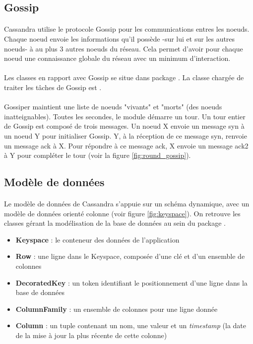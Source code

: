 \documentclass[12pt]{article}
\begin{document}
\subsection{Gossip}

\paragraph{} Cassandra utilise le protocole Gossip pour les communications entres les noeuds. Chaque noeud envoie les informations qu'il possède -sur lui et sur les autres noeuds- à au plus 3 autres noeuds du réseau. Cela permet d'avoir pour chaque noeud une connaissance globale du réseau avec un minimum d'interaction.
\paragraph{} Les classes en rapport avec Gossip se situe dans package . La classe chargée de traiter les tâches de Gossip est .
\paragraph{} Gossiper maintient une liste de noeuds "vivants" et "morts" (des noeuds inatteignables). Toutes les secondes, le module démarre un tour. Un tour entier de Gossip est composé de trois messages. Un noeud X envoie un message syn à un noeud Y pour initialiser Gossip. Y, à la réception de ce message syn, renvoie un message ack à X. Pour répondre à ce message ack, X envoie un message ack2 à Y pour compléter le tour (voir la figure \ref{fig:round_gossip}).

\subsection{Modèle de données}

\paragraph{} Le modèle de données de Cassandra s’appuie sur un schéma dynamique, avec un modèle de données orienté colonne (voir figure \ref{fig:keyspace}). On retrouve les classes gérant la modélisation de la base de données au sein du package .

\begin{itemize}
	\item \textbf{Keyspace} : le conteneur des données de l'application
	\item \textbf{Row} : une ligne dans le Keyspace, composée d'une clé et d'un ensemble de colonnes
	\item \textbf{DecoratedKey} : un token identifiant le positionnement d'une ligne dans la base de données
	\item \textbf{ColumnFamily} : un ensemble de colonnes pour une ligne donnée
	\item \textbf{Column} : un tuple contenant un nom, une valeur et un \textit{timestamp} (la date de la mise à jour la plus récente de cette colonne)
\end{itemize}
\end{document}
